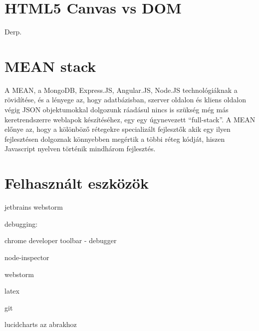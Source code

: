 \section{HTML5 Canvas vs DOM}
Derp.
















\section{MEAN stack}


A MEAN, a MongoDB, Express.JS, Angular.JS, Node.JS technológiáknak a rövidítése, és a lényege az, hogy adatbázisban, szerver oldalon és kliens oldalon végig JSON objektumokkal dolgozunk ráadásul nincs is szükség még más keretrendszerre weblapok készítéséhez, egy egy úgynevezett ``full-stack''. A MEAN előnye az, hogy a kölönböző rétegekre specializált fejlesztők akik egy ilyen fejlesztésen dolgoznak könnyebben megértik a többi réteg kódját, hiszen Javascript nyelven történik mindhárom fejlesztés. 


\section{Felhasznált eszközök}

jetbrains webstorm

debugging:

chrome developer toolbar - debugger

node-inspector

webstorm

latex

git

lucidcharts az abrakhoz



